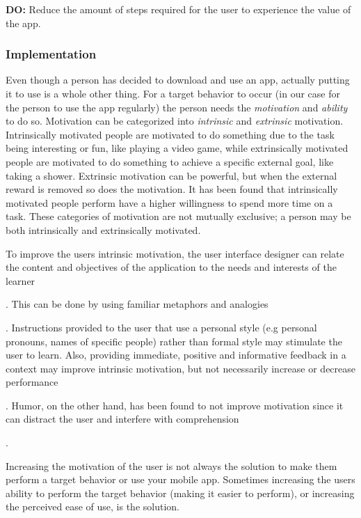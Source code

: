 \begin{displayquote}
  \textbf{DO:} Reduce the amount of steps required for the user to experience the value of the app.
\end{displayquote}

\subsubsection{Implementation}
Even though a person has decided to download and use an app, actually putting it to use is a whole other thing. For a target behavior to occur (in our case for the person to use the app regularly) the person needs the \textit{motivation} and \textit{ability} to do so. Motivation can be categorized into \textit{intrinsic} and \textit{extrinsic} motivation. Intrinsically motivated people are motivated to do something due to the task being interesting or fun, like playing a video game, while extrinsically motivated people are motivated to do something to achieve a specific external goal, like taking a shower. Extrinsic motivation can be powerful, but when the external reward is removed so does the motivation. It has been found that intrinsically motivated people perform have a higher willingness to spend more time on a task. These categories of motivation are not mutually exclusive; a person may be both intrinsically and extrinsically motivated.

To improve the users intrinsic motivation, the user interface designer can relate the content and objectives of the application to the needs and interests of the learner . This can be done by using familiar metaphors and analogies . Instructions provided to the user that use a personal style (e.g personal pronouns, names of specific people) rather than formal style may stimulate the user to learn. Also, providing immediate, positive and informative feedback in a context may improve intrinsic motivation, but not necessarily increase or decrease performance . Humor, on the other hand, has been found to not improve motivation since it can distract the user and interfere with comprehension .

Increasing the motivation of the user is not always the solution to make them perform a target behavior or use your mobile app. Sometimes increasing the users ability to perform the target behavior (making it easier to perform), or increasing the perceived ease of use, is the solution.

